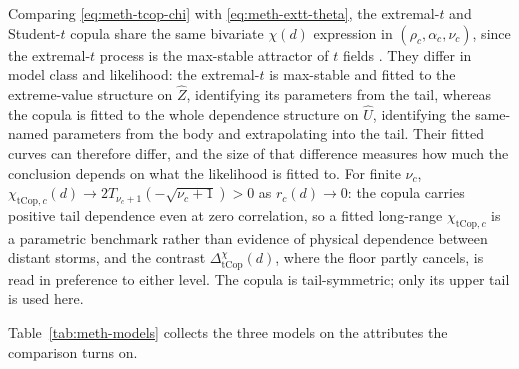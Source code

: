 Comparing \eqref{eq:meth-tcop-chi} with \eqref{eq:meth-extt-theta}, the extremal-\(t\) and Student-\(t\) copula share the same bivariate \(\chi(d)\) expression in \((\rho_c,\alpha_c,\nu_c)\), since the extremal-\(t\) process is the max-stable attractor of \(t\) fields \citep{opitz2013,nikoloulopoulos2009}. They differ in model class and likelihood: the extremal-\(t\) is max-stable and fitted to the extreme-value structure on \(\widehat Z\), identifying its parameters from the tail, whereas the copula is fitted to the whole dependence structure on \(\widehat U\), identifying the same-named parameters from the body and extrapolating into the tail. Their fitted curves can therefore differ, and the size of that difference measures how much the conclusion depends on what the likelihood is fitted to. For finite \(\nu_c\), \(\chi_{\mathrm{tCop},c}(d)\to2T_{\nu_c+1}(-\sqrt{\nu_c+1})>0\) as \(r_c(d)\to0\): the copula carries positive tail dependence even at zero correlation, so a fitted long-range \(\chi_{\mathrm{tCop},c}\) is a parametric benchmark rather than evidence of physical dependence between distant storms, and the contrast \(\Delta_{\mathrm{tCop}}^{\chi}(d)\), where the floor partly cancels, is read in preference to either level. The copula is tail-symmetric; only its upper tail is used here.

Table~\ref{tab:meth-models} collects the three models on the attributes the comparison turns on.


